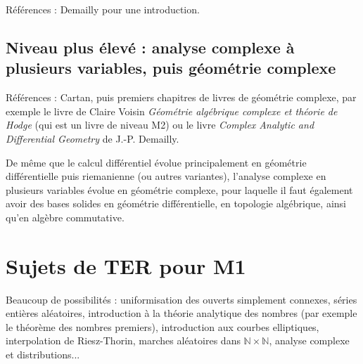 \documentclass[11pt,a4paper]{book}
\newcommand{\N}{\mathbb{N}}
\theoremstyle{definition}
\theoremstyle{plain}
\begin{document}
Références : Demailly pour une introduction.

\subsection{Niveau plus élevé :  analyse complexe à plusieurs variables, puis géométrie complexe}

Références : Cartan, puis premiers chapitres de livres de géométrie complexe, par exemple le livre de Claire Voisin \emph{Géométrie algébrique complexe et théorie de Hodge} (qui est un livre de niveau M2) ou le livre \emph{Complex Analytic and Differential Geometry} de J.-P. Demailly.

De même que le calcul différentiel évolue principalement en géométrie différentielle puis riemanienne (ou autres variantes), l'analyse complexe en plusieurs variables évolue en géométrie complexe, pour laquelle il faut également avoir des bases solides en géométrie différentielle, en topologie algébrique, ainsi qu'en algèbre commutative.

\section{Sujets de TER pour M1}

Beaucoup de possibilités : uniformisation des ouverts simplement connexes, séries entières aléatoires, introduction à la théorie analytique des nombres (par exemple le théorème des nombres premiers), introduction aux courbes elliptiques, interpolation de Riesz-Thorin, marches aléatoires dans $\N\times\N$, analyse complexe et distributions...
\end{document}
